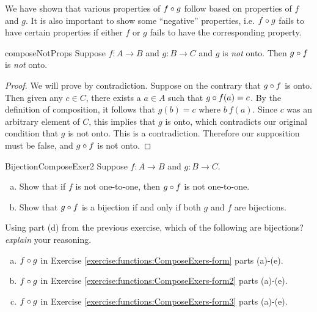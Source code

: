We have shown that various properties of $f \circ g$ follow based on properties of $f$ and $g$.  It is also important to show some ``negative'' properties, i.e. $f \circ g$ fails to have certain properties if either $f$ or $g$ fails to have the corresponding property.

\begin{example}{composeNotProps}
 Suppose $f \colon A \to B$ and $g \colon B \to C$ and $g$ is \emph{not} onto.  Then $g \circ f$ is \emph{not} onto.

\begin{proof}
We will prove by contradiction.  Suppose on the contrary that $g \circ f$ is onto.  Then given any $c \in C$, there exists a $a \in A$ such that
$g \circ f(a)=c$.  By the definition of composition, it follows that $g(b) = c$ where $b \ f(a)$.  Since $c$ was an arbitrary element of $C$, this implies that $g$ is onto, which contradicts our original condition that $g$ is not onto.  This is a contradiction. Therefore our supposition must be false, and $g \circ f$ is not onto.
\end{proof}
\end{example}

 \begin{exercise}{BijectionComposeExer2}
 Suppose $f \colon A \to B$ and $g \colon B \to C$.
 \begin{enumerate}[(a)]
  \item  \label{BijectionComposeExer-g2}
Show that if $f$ is not one-to-one, then $g \circ f$ is not one-to-one.
\item
Show that $g \circ f$ is a bijection if and only if both $g$ and $f$ are bijections.
 \end{enumerate}
 \end{exercise}

\begin{exercise}{}
Using part (d) from the previous exercise, which of the following are bijections? \emph{explain} your reasoning.
\begin{enumerate}[(a)]
\item
$f \circ g$ in  Exercise \ref{exercise:functions:ComposeExers-form} parts (a)-(e).
\item
$f \circ g$ in  Exercise \ref{exercise:functions:ComposeExers-form2} parts (a)-(e).
\item
$f \circ g$ in  Exercise \ref{exercise:functions:ComposeExers-form3} parts (a)-(e).
\end{enumerate}
\end{exercise}

